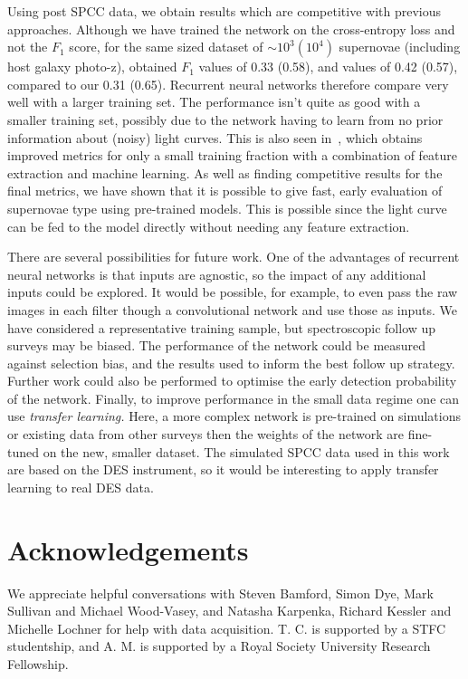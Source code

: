 \documentclass[nofootinbib,amsmath,amssymb,10pt,eqsecnum, twocolumn]{revtex4-1}
\begin{document}
Using post SPCC data, we obtain results which are competitive with previous approaches.  Although we have trained the network on the cross-entropy loss  and not the $F_1$ score, for the same sized dataset of $\sim10^3 (10^4)$ supernovae (including host galaxy photo-z), \cite{Karpenka:2012pm} obtained $F_1$ values of 0.33 (0.58), and \cite{Newling:2010bp} values of 0.42 (0.57), compared to our  0.31 (0.65). Recurrent neural networks  therefore compare very well with a larger training  set. The performance isn't  quite as good with a smaller training set, possibly due to the network having to learn from no prior information about (noisy) light curves. This is also seen in~\cite{Lochner:2016hbn}, which obtains improved metrics for only a small training fraction with a combination of feature extraction and machine learning. As well as finding competitive results for the final metrics, we have shown that it is possible to give fast, early evaluation of supernovae type using pre-trained models. This is possible since the light curve can be fed to the model directly without needing any feature extraction.  

There are several possibilities for future work. One of the advantages of recurrent neural networks is that inputs are agnostic, so the impact of any additional inputs could be explored. It would be possible, for example, to even pass the raw images in each filter though a convolutional network and use those as inputs. We have considered a representative training sample, but spectroscopic follow up surveys may be biased. The performance of the network could be measured against selection bias, and the results used to inform the best follow up strategy.  Further work could also be performed to optimise the early detection probability of the network.  Finally, to improve performance in the small data regime one can use {\em transfer learning.} Here, a more complex network is pre-trained on simulations or existing data from other surveys then the weights of the network are fine-tuned on the new, smaller dataset. The simulated SPCC data used in this work are based on the DES instrument, so it would be interesting to apply transfer learning to real DES data. 

\section*{Acknowledgements}

We appreciate helpful conversations with Steven Bamford, Simon Dye, Mark Sullivan and Michael Wood-Vasey, and Natasha Karpenka, Richard Kessler and Michelle Lochner for help with data acquisition. T. C. is supported by a STFC studentship, and A. M. is supported by a Royal Society University Research Fellowship.


\end{document}
